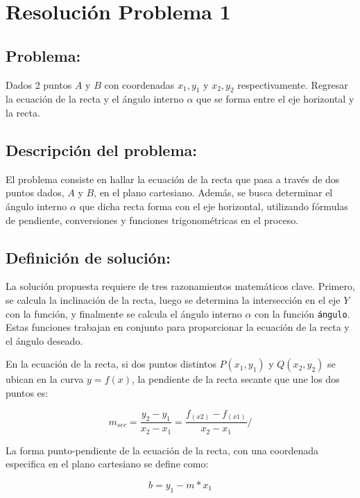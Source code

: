 \section{Resolución Problema 1} 
\subsection{Problema:}
Dados 2 puntos $A \mbox{ y } B$ con coordenadas $x_{1}, y_{1}$ y $x_{2}, y_{2}$  respectivamente. Regresar la ecuación de la recta y el ángulo interno $\alpha$ que se forma entre el eje horizontal y la recta. 

\subsection{\textbf{Descripción del problema:}}
El problema consiste en hallar la ecuación de la recta que pasa a través de dos puntos dados, \( A \) y \( B \), en el plano cartesiano. Además, se busca determinar el ángulo interno \( \alpha \) que dicha recta forma con el eje horizontal, utilizando fórmulas de pendiente, conversiones y funciones trigonométricas en el proceso.


\subsection{\textbf{Definición de solución:}}
La solución propuesta requiere de tres razonamientos matemáticos clave. Primero, se calcula la inclinación de la recta, luego se determina la intersección en el eje \(Y\) con la función, y finalmente se calcula el ángulo interno \(\alpha\) con la función \texttt{ángulo}. Estas funciones trabajan en conjunto para proporcionar la ecuación de la recta y el ángulo deseado.

En la ecuación de la recta, si dos puntos distintos \(P(x_{1}, y_{1})\) y \(Q(x_{2}, y_{2})\) se ubican en la curva \(y=f(x)\), la pendiente de la recta secante que une los dos puntos es:

\begin{equation}
    m_{sec}=\frac{y_{2} - y_{1}}{x_{2} - x_{1}} = \frac{f_{(x2)} - f_{(x1)} }{x_{2} - x_{1}}/
    \label{eqn:rectaPendiente}
\end{equation}

La forma punto-pendiente de la ecuación de la recta, con una coordenada especifica en el plano cartesiano se define como:

\begin{equation}
    b = y_{1} - m * x_{1}
     \label{eqn:eqnRecta}
\end{equation}

